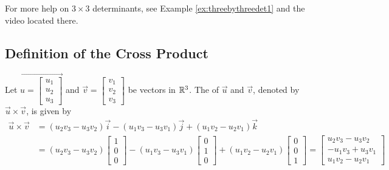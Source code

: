 \documentclass{ximera}
\begin{document}
For more help on $3 \times 3$ determinants, see Example \ref{ex:threebythreedet1} and the video located there.

\subsection*{Definition of the Cross Product}

\begin{definition}\label{def:crossproduct} Let $\vec{u=\begin{bmatrix}u_1\\u_2\\u_3\end{bmatrix}}$ and $\vec{v}=\begin{bmatrix}v_1\\v_2\\v_3\end{bmatrix}$ be vectors in $\mathbb{R}^3$.  The  of $\vec{u}$ and $\vec{v}$, denoted by $\vec{u}\times\vec{v}$, is given by
\begin{align*}
\vec{u}\times\vec{v}&=(u_2v_3-u_3v_2)\vec{i}-(u_1v_3-u_3v_1)\vec{j}+(u_1v_2-u_2v_1)\vec{k} \\
&=(u_2v_3-u_3v_2)\begin{bmatrix}1\\0\\0\end{bmatrix}-(u_1v_3-u_3v_1)\begin{bmatrix}0\\1\\0\end{bmatrix}+(u_1v_2-u_2v_1)\begin{bmatrix}0\\0\\1\end{bmatrix}=\begin{bmatrix}u_2v_3-u_3v_2\\-u_1v_3+u_3v_1\\u_1v_2-u_2v_1\end{bmatrix}
\end{align*}
\end{definition}
\end{document}

